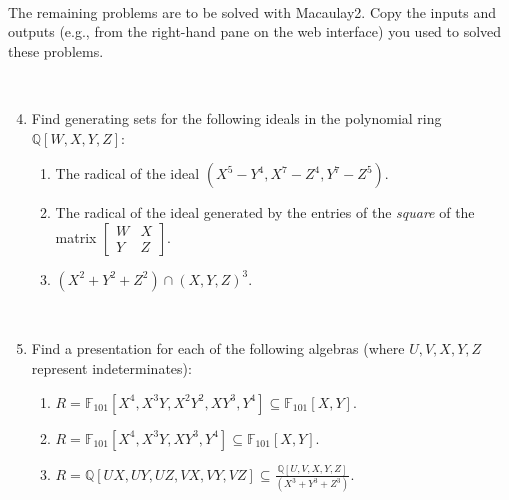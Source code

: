 \documentclass[12pt]{amsart}
\newcommand{\Q}{\mathbb{Q}}
\newcommand{\F}{\mathbb{F}}
\begin{document}
\


The remaining problems are to be solved with Macaulay2. Copy the inputs and outputs (e.g., from the right-hand pane on the web interface) you used to solved these problems.

\

\begin{enumerate}\setcounter{enumi}{3}


\item Find generating sets for the following ideals in the polynomial ring $\Q[W,X,Y,Z]$:
\begin{enumerate}
\item The radical of the ideal $(X^5-Y^4,X^7-Z^4,Y^7-Z^5)$.
\item The radical of the ideal generated by the entries of the \emph{square} of the matrix $\begin{bmatrix} W & X \\ Y& Z\end{bmatrix}$.
\item $(X^2+Y^2+Z^2) \cap (X,Y,Z)^3$.
\end{enumerate}

\

\item Find a presentation for each of the following algebras (where $U,V,X,Y,Z$ represent indeterminates):
\begin{enumerate}
\item $R=\F_{101}[X^4,X^3Y,X^2Y^2,XY^3,Y^4]\subseteq \F_{101}[X,Y]$.
\item  $R=\F_{101}[X^4,X^3Y,XY^3,Y^4]\subseteq \F_{101}[X,Y]$.
\item  $\displaystyle R=\Q[UX,UY,UZ,VX,VY,VZ]\subseteq \frac{\Q[U,V,X,Y,Z]}{(X^3+Y^3+Z^3)}$.
\end{enumerate}

\



\end{enumerate}
\end{document}
